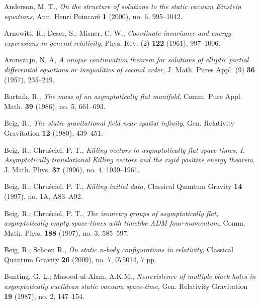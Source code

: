 \documentclass[12pt]{amsart}
\theoremstyle{remark}
\numberwithin{equation}{section}
\begin{document}
\begin{thebibliography}{10}

 Anderson, M. T.,
{\sl  On the structure of solutions to the static vacuum Einstein equations}, Ann. Henri Poincar\'e  \textbf{1}  (2000),  no. 6, 995--1042.

 Arnowitt, R.; Deser, S.; Misner, C. W.,
{\sl Coordinate invariance and energy expressions in
general relativity}, Phys. Rev. (2) \textbf{122}  (1961),  997--1006.

  Aronszajn, N. A,
 {\sl A unique continuation theorem for solutions of elliptic partial differential equations or inequalities of second order,} J. Math. Pures Appl. (9) \textbf{ 36} (1957), 235--249.

 Bartnik, R., {\sl The mass of an asymptotically flat manifold}, Comm. Pure Appl. Math.  \textbf{39} (1986), no. 5, 661--693.



   Beig, R., {\sl The static gravitational field near spatial infinity},  Gen. Relativity Gravitation \textbf{12} (1980),  439--451.

Beig, R.; Chru\'{s}ciel,  P. T.,
{\sl Killing vectors in asymptotically flat space-times. I. Asymptotically translational Killing vectors and the rigid positive energy theorem},
J. Math. Phys. \textbf{37} (1996), no. 4, 1939--1961.

Beig, R.; Chru\'{s}ciel,  P. T.,
{\sl Killing initial data},   Classical Quantum Gravity \textbf{14} (1997),  no. 1A,  A83--A92.

Beig, R.; Chru\'{s}ciel,  P. T.,
{\sl The isometry groups of asymptotically flat, asymptotically empty space-times with timelike ADM four-momentum},
 Comm. Math. Phys.  \textbf{188} (1997), no. 3, 585--597.

   Beig, R.; Schoen R., {\sl On static n-body configurations in relativity},
 Classical Quantum Gravity \textbf{26} (2009), no. 7, 075014, 7 pp.

 Bunting, G. L.; Masood-ul-Alam, A.K.M., {\sl Nonexistence of multiple black
holes in asymptotically euclidean static vacuum space-time}, Gen. Relativity Gravitation \textbf{19} (1987), no. 2, 147--154.


\end{thebibliography}
\end{document}
